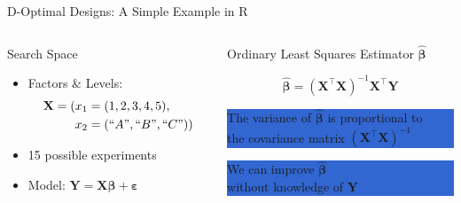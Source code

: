 \documentclass[10pt, compress, aspectratio=169, xcolor={table,usenames,dvipsnames}]{beamer}
\begin{document}
\begin{frame}[label={sec:orgc7319a4}]{D-Optimal Designs: A Simple Example in R}
\begin{columns}
\begin{column}{0.5\columnwidth}
\begin{block}{Search Space}
\begin{itemize}
\item Factors \& Levels:
\begin{align*}
\mathbf{X} = (x_1 = & \; (1, 2, 3, 4, 5), \\
x_2 = & \; (``A", ``B", ``C"))
\end{align*}
\item 15 possible experiments
\item Model: \(\mathbf{Y} = \mathbf{X}\bm{\beta} + \bm{\varepsilon}\)
\end{itemize}
\end{block}
\end{column}

\begin{column}{0.5\columnwidth}
\begin{block}{Ordinary Least Squares Estimator \(\bm{\hat{\beta}}\)}
\begin{center}
\begin{equation*}
\bm{\hat{\beta}} = \left(\bm{X}^{\intercal}\bm{X}\right)^{-1}\bm{X}^{\intercal}\bm{Y}
\end{equation*}
\end{center}

\begin{center}
\colorbox{Highlight}{\parbox[c]{0.8\columnwidth}{\centering   The  variance   of
    $\bm{\hat{\beta}}$  is  \alert{proportional}  to \\  the  covariance  matrix
    $\left(\bm{X}^{\intercal}\bm{X}\right)^{-1}$}}

\pause

\colorbox{Highlight}{\parbox[c]{0.8\columnwidth}{\centering   We   can   improve
    $\bm{\hat{\beta}}$ \\ \alert{without knowledge} of $\bm{Y}$}}
\end{center}
\end{block}
\end{column}
\end{columns}
\end{frame}
\end{document}
